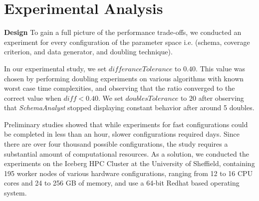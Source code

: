 
\section{Experimental Analysis}


\textbf{Design} To gain a full picture of the performance trade-offs, we conducted an experiment for every configuration of the
parameter space i.e. (schema, coverage criterion, and data generator, and doubling technique). 

In our experimental study, we set $\mathit{differanceTolerance}$ to
$0.40$. This value was chosen by performing doubling
experiments on various algorithms with known worst case time
complexities, and observing that the ratio converged to the correct
value when $\mathit{diff} < 0.40$.
We set $\mathit{doublesTolerance}$ to $20$ after observing that
\textit{SchemaAnalyst} stopped displaying constant behavior after around
5 doubles.

Preliminary studies showed that while experiments for
fast configurations could be completed in less than an
hour, slower configurations required days. Since there
are over four thousand possible configurations, the study
requires a substantial amount of computational resources.
As a solution, we conducted the experiments on the Iceberg
HPC Cluster at the University of Sheffield, containing
195 worker nodes of various hardware configurations,
ranging from 12 to 16 CPU cores and 24 to 256 GB of
memory, and use a 64-bit Redhat based operating system.
